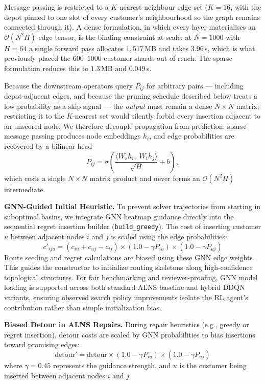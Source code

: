 \documentclass[conference]{IEEEtran}
\begin{document}
Message passing is restricted to a $K$-nearest-neighbour edge set ($K=16$, with
the depot pinned to one slot of every customer's neighbourhood so the graph
remains connected through it). A dense formulation, in which every layer
materialises an $\mathcal{O}(N^2 H)$ edge tensor, is the binding constraint at
scale: at $N=1000$ with $H=64$ a single forward pass allocates $1{,}517$\,MB and
takes $3.96$\,s, which is what previously placed the $600$--$1000$-customer shards
out of reach. The sparse formulation reduces this to $1.3$\,MB and $0.049$\,s.

Because the downstream operators query $P_{ij}$ for arbitrary pairs --- including
depot-adjacent edges, and because the pruning schedule described below treats a
low probability as a skip signal ---
the \emph{output} must remain a dense $N \times N$ matrix; restricting it to the
$K$-nearest set would silently forbid every insertion adjacent to an unscored
node. We therefore decouple propagation from prediction: sparse message passing
produces node embeddings $h_i$, and edge probabilities are recovered by a
bilinear head
\begin{equation}
  P_{ij} = \sigma\!\left( \frac{\langle W_s h_i,\; W_t h_j \rangle}{\sqrt{H}} + b \right),
\end{equation}
which costs a single $N \times N$ matrix product and never forms an
$\mathcal{O}(N^2 H)$ intermediate.

\textbf{GNN-Guided Initial Heuristic.}
To prevent solver trajectories from starting in suboptimal basins, we integrate GNN heatmap guidance directly into the sequential regret insertion builder (\texttt{build\_greedy}). The cost of inserting customer $u$ between adjacent nodes $i$ and $j$ is scaled using the edge probabilities:
\begin{equation}
  c'_{iju} = \left(c_{iu} + c_{uj} - c_{ij}\right) \times \left(1.0 - \gamma P_{iu}\right) \times \left(1.0 - \gamma P_{uj}\right)
\end{equation}
Route seeding and regret calculations are biased using these GNN edge weights. This guides the constructor to initialize routing skeletons along high-confidence topological structures. For fair benchmarking and reviewer-proofing, GNN model loading is supported across both standard ALNS baseline and hybrid DDQN variants, ensuring observed search policy improvements isolate the RL agent's contribution rather than simple initialization bias.

\textbf{Biased Detour in ALNS Repairs.}
During repair heuristics (e.g., greedy or regret insertion), detour costs are scaled by GNN probabilities to bias insertions toward promising edges:
\begin{equation}
  \text{detour}' = \text{detour} \times \left(1.0 - \gamma P_{iu}\right) \times \left(1.0 - \gamma P_{uj}\right)
\end{equation}
where $\gamma = 0.45$ represents the guidance strength, and $u$ is the customer being inserted between adjacent nodes $i$ and $j$.
\end{document}
